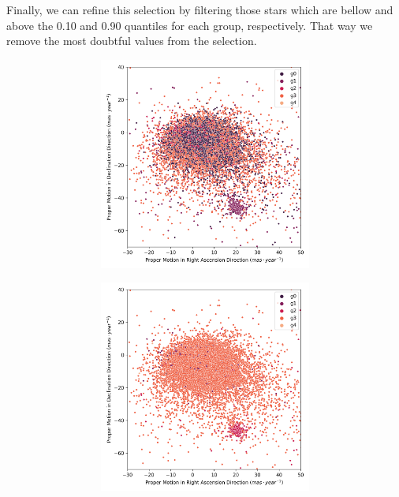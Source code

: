 \documentclass[11pt,a4paper,english,twocolumn]{article}
\begin{document}
Finally, we can refine this selection by filtering those stars which are bellow and above
the 0.10 and 0.90 quantiles for each group, respectively.
That way we remove the most doubtful values from the selection.

\begin{figure}[htbp]
  \centering
  \begin{subfigure}{\columnwidth}
    \centering
    \begin{subfigure}[t]{0.3\textwidth}
      \centering
      \includegraphics[width=\textwidth]{../figures/melotte_22/kmeans_pm_melotte_22.png}
    \end{subfigure}
    \hfill
    \begin{subfigure}[t]{0.3\textwidth}
      \centering
      \includegraphics[width=\textwidth]{../figures/melotte_22/dec_pm_melotte_22.png}

\end{subfigure}
\end{subfigure}
\end{figure}
\end{document}
